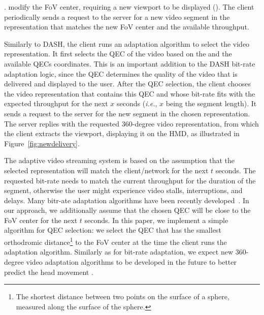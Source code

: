 .
 modify the FoV center, requiring a new viewport
to be displayed (). The client periodically sends a request
to the server for a new video segment in the representation that
matches  the new FoV center and the available throughput.

 Similarly to \ac{DASH}, the client runs
an adaptation algorithm to select the video representation. It first
selects the \ac{QEC} of the video based on the  and
the available \acp{QEC} coordinates. This is an important addition to
the \ac{DASH} bit-rate adaptation logic, since the \ac{QEC} determines
the quality of the video that is delivered and displayed to the user.
After the \ac{QEC} selection, the client chooses the video
representation that contains this \ac{QEC} and whose bit-rate fits
with the expected throughput for the next $x$ seconds (\textit{i.e.},
$x$ being the segment length). It sends a request to the server
for the new segment in the chosen representation. The server replies
with the requested 360-degree video representation, from which the
client extracts the viewport, displaying it on the \ac{HMD}, as
illustrated in Figure~\ref{fig:newdelivery}.

The adaptive video streaming system is based on the assumption that
the selected representation will match the client/network
 for the next $t$ seconds. The requested bit-rate
needs to match the current throughput for the duration of the segment,
otherwise the user might experience video stalls, interruptions, and
delays. Many bitr-ate adaptation algorithms have been recently
developed~\cite{tian,probe_li_2014,miller,zou,liu}. In our approach,
we additionally assume that the chosen \ac{QEC} will be close to the
\ac{FoV} center for the next $t$ seconds. In this paper, we implement
a simple algorithm for \ac{QEC} selection: we select the \ac{QEC} that
has the smallest orthodromic distance\footnote{The shortest distance
between two points on the surface of a sphere, measured along the
surface of the sphere. } to the FoV center at the time the client runs
the adaptation algorithm. Similarly as for bit-rate adaptation, we
expect new 360-degree video adaptation algorithms to be developed in
the future to better predict the head movement .


